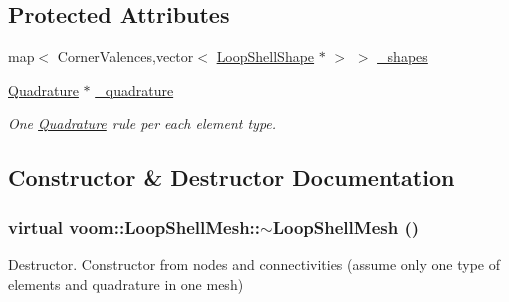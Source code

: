 \subsection*{Protected Attributes}
\begin{DoxyCompactItemize}
\item 
map$<$ CornerValences,vector$<$ \hyperlink{classvoom_1_1_loop_shell_shape}{LoopShellShape} $\ast$ $>$ $>$ \hyperlink{classvoom_1_1_loop_shell_mesh_a95466b793ea0a50b017483aac2b4bfcd}{\_\-shapes}
\item 
\hypertarget{classvoom_1_1_loop_shell_mesh_ad899b5348b7003dafa41cfd9836ae651}{
\hyperlink{classvoom_1_1_quadrature}{Quadrature} $\ast$ \hyperlink{classvoom_1_1_loop_shell_mesh_ad899b5348b7003dafa41cfd9836ae651}{\_\-quadrature}}
\label{classvoom_1_1_loop_shell_mesh_ad899b5348b7003dafa41cfd9836ae651}

\begin{DoxyCompactList}\small\item\em One \hyperlink{classvoom_1_1_quadrature}{Quadrature} rule per each element type. \item\end{DoxyCompactList}\end{DoxyCompactItemize}


\subsection{Constructor \& Destructor Documentation}
\hypertarget{classvoom_1_1_loop_shell_mesh_a5e541b0fc9ac4261737825a41e45f01c}{
\subsubsection[{$\sim$LoopShellMesh}]{\setlength{\rightskip}{0pt plus 5cm}virtual voom::LoopShellMesh::$\sim$LoopShellMesh ()}}
\label{classvoom_1_1_loop_shell_mesh_a5e541b0fc9ac4261737825a41e45f01c}


Destructor. Constructor from nodes and connectivities (assume only one type of elements and quadrature in one mesh) 

